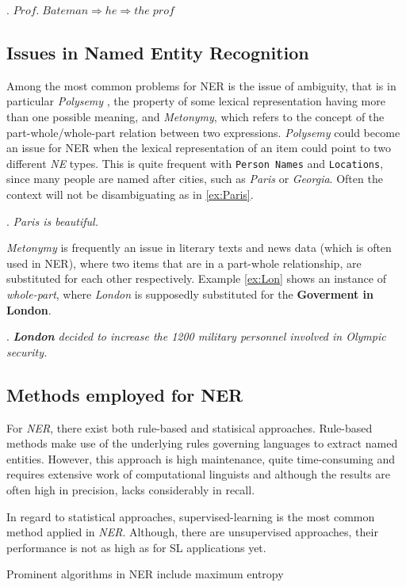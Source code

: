 \documentclass[11pt]{article}
\begin{document}
\ex. $ Prof.\; Bateman \Rightarrow he \Rightarrow the \; prof$


\subsection*{Issues in Named Entity Recognition}
Among the most common problems for NER is the issue of ambiguity, that is in particular \emph{Polysemy} \cite{nadeau2007survey}, 
the property of some lexical representation having
more than one possible meaning, and \emph{Metonymy}, which refers to the concept of the part-whole/whole-part relation between two expressions. 
\emph{Polysemy} could become an issue for NER when the lexical representation of an item could point to two different \emph{NE} types.
This is quite frequent with \texttt{Person Names} and \texttt{Locations}, since many people are named after cities, such as \emph{Paris} or \emph{Georgia}. 
Often the context will not be disambiguating as in \ref{ex:Paris}.

\ex. \emph{Paris is beautiful.} \label{ex:Paris}

\emph{Metonymy} is frequently an issue in literary texts and news data (which is often used in NER), where two items that are in a part-whole
relationship, are substituted for each other respectively. Example \ref{ex:Lon} shows an instance of \emph{whole-part}, where \emph{London} is supposedly substituted
for the \textbf{Goverment in London}. 

\ex. \emph{\textbf{London} decided to increase the 1200 military personnel involved in Olympic security.} \label{ex:Lon}

\subsection*{Methods employed for NER}
For \emph{NER}, there exist both rule-based and statisical approaches. 
Rule-based methods make use of the underlying rules governing languages to extract named entities. 
However, this approach is high maintenance, quite time-consuming and requires extensive work of computational linguists \cite{nadeau2007survey}
and although the results are 
often high in precision, lacks considerably in recall.

In regard to statistical approaches, supervised-learning is the most common method applied in \emph{NER}. Although, there are unsupervised approaches, 
their performance is not as high as for SL applications yet.

Prominent algorithms in NER include maximum entropy
% 
\end{document}
